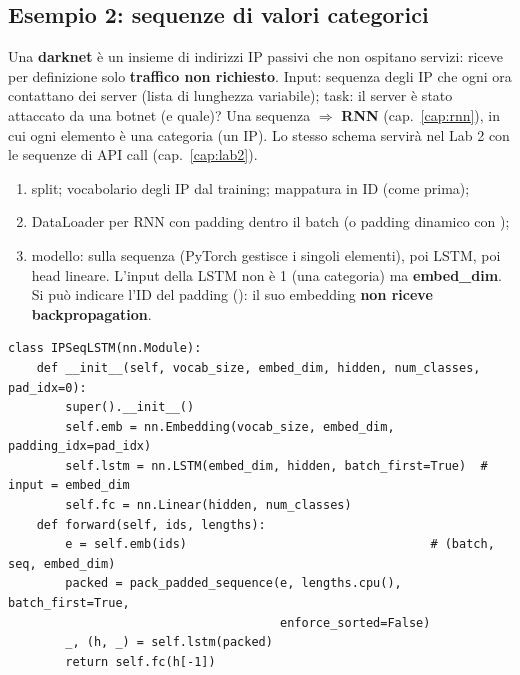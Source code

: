 \subsection{Esempio 2: sequenze di valori categorici}
Una \textbf{darknet} è un insieme di indirizzi IP passivi che non ospitano servizi: riceve per definizione solo \textbf{traffico non richiesto}.
Input: sequenza degli IP che ogni ora contattano dei server (lista di lunghezza variabile); task: il server è stato attaccato da una botnet (e
quale)? Una sequenza $\Rightarrow$ \textbf{RNN} (cap.~\ref{cap:rnn}), in cui ogni elemento è una categoria (un IP). Lo stesso schema servirà
nel Lab 2 con le sequenze di API call (cap.~\ref{cap:lab2}).
\begin{enumerate}
  \item split; vocabolario degli IP dal training; mappatura in ID (come prima);
  \item DataLoader per RNN con padding dentro il batch (o padding dinamico con );
  \item modello:  sulla sequenza (PyTorch gestisce i singoli elementi), poi LSTM, poi head lineare. L'input della LSTM non è 1
        (una categoria) ma \textbf{embed\_dim}. Si può indicare l'ID del padding (): il suo embedding \textbf{non riceve backpropagation}.
\end{enumerate}
\begin{lstlisting}
class IPSeqLSTM(nn.Module):
    def __init__(self, vocab_size, embed_dim, hidden, num_classes, pad_idx=0):
        super().__init__()
        self.emb = nn.Embedding(vocab_size, embed_dim, padding_idx=pad_idx)
        self.lstm = nn.LSTM(embed_dim, hidden, batch_first=True)  # input = embed_dim
        self.fc = nn.Linear(hidden, num_classes)
    def forward(self, ids, lengths):
        e = self.emb(ids)                                  # (batch, seq, embed_dim)
        packed = pack_padded_sequence(e, lengths.cpu(), batch_first=True,
                                      enforce_sorted=False)
        _, (h, _) = self.lstm(packed)
        return self.fc(h[-1])
\end{lstlisting}

